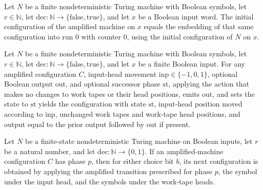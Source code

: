 \begin{theorem}
\label{Randomized.Amplify.init_eq_emb}
\leanok
{}
Let $N$ be a finite nondeterministic Turing machine with Boolean symbols, let
$r\in\mathbb{N}$, let $\mathrm{dec}:\mathbb{N}\to\{\mathrm{false},\mathrm{true}\}$, and
let $x$ be a Boolean input word. The initial configuration of the amplified machine on
$x$ equals the embedding of that same configuration into run $0$ with counter $0$, using
the initial configuration of $N$ on $x$.
\end{theorem}

\begin{theorem}
\label{Randomized.Amplify.idle_apply}
\leanok
{}
Let $N$ be a finite nondeterministic Turing machine with Boolean symbols, let
$r\in\mathbb{N}$, let $\mathrm{dec}:\mathbb{N}\to\{\mathrm{false},\mathrm{true}\}$, and
let $x$ be a finite Boolean input. For any amplified configuration $C$, input-head
movement $\mathrm{inp}\in\{-1,0,1\}$, optional Boolean output $\mathrm{out}$, and
optional successor phase $\mathrm{st}$, applying the action that makes no changes to
work tapes or their head positions, emits $\mathrm{out}$, and sets the state to
$\mathrm{st}$ yields the configuration with state $\mathrm{st}$, input-head position
moved according to $\mathrm{inp}$, unchanged work tapes and work-tape head positions,
and output equal to the prior output followed by $\mathrm{out}$ if present.
\end{theorem}

\begin{theorem}
\label{Randomized.Amplify.step_of_state}
\leanok
{}
Let $N$ be a finite-state nondeterministic Turing machine on Boolean inputs, let $r$ be
a natural number, and let $\mathrm{dec}:\mathbb{N}\to\{0,1\}$. If an amplified-machine
configuration $C$ has phase $p$, then for either choice bit $b$, its next configuration
is obtained by applying the amplified transition prescribed for phase $p$, the symbol
under the input head, and the symbols under the work-tape heads.
\end{theorem}

